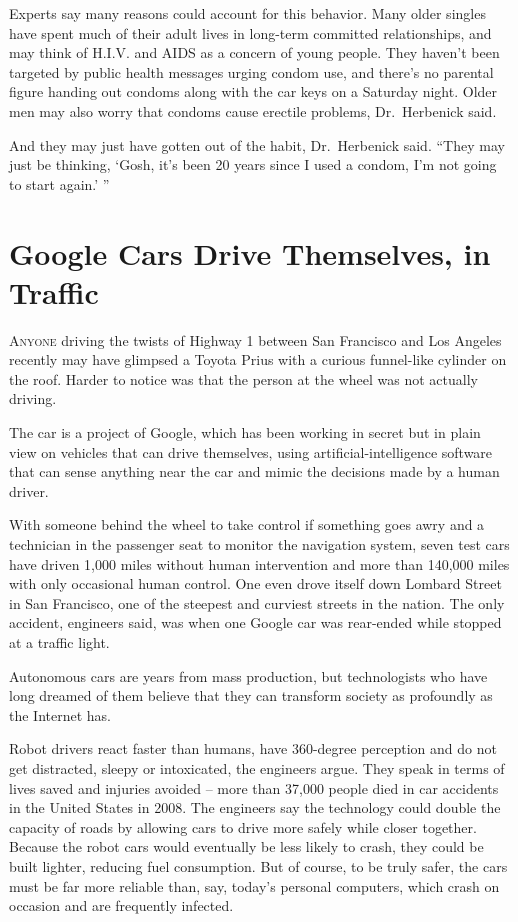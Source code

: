 ﻿\documentclass[12pt]{article}
\begin{document}
Experts say many reasons could account for this behavior. Many older singles have spent much of
their adult lives in long-term committed relationships, and may think of H.I.V. and AIDS as a
concern of young people. They haven't been targeted by public health messages urging condom use, and
there's no parental figure handing out condoms along with the car keys on a Saturday night. Older
men may also worry that condoms cause erectile problems, Dr.~Herbenick said.

And they may just have gotten out of the habit, Dr.~Herbenick said. ``They may just be thinking,
`Gosh, it's been 20 years since I used a condom, I'm not going to start again.' ''

\section{Google Cars Drive Themselves, in Traffic}

\lettrine{A}{nyone} driving the twists of Highway 1 between San Francisco
and Los Angeles recently may have glimpsed a Toyota Prius with a curious funnel-like cylinder on the
roof. Harder to notice was that the person at the wheel was not actually driving.

The car is a project of Google, which has been working in secret but in plain view on vehicles that
can drive themselves, using artificial-intelligence software that can sense anything near the car
and mimic the decisions made by a human driver.

With someone behind the wheel to take control if something goes awry and a technician in the
passenger seat to monitor the navigation system, seven test cars have driven 1,000 miles without
human intervention and more than 140,000 miles with only occasional human control. One even drove
itself down Lombard Street in San Francisco, one of the steepest and curviest streets in the nation.
The only accident, engineers said, was when one Google car was rear-ended while stopped at a traffic
light.

Autonomous cars are years from mass production, but technologists who have long dreamed of them
believe that they can transform society as profoundly as the Internet has.

Robot drivers react faster than humans, have 360-degree perception and do not get distracted, sleepy
or intoxicated, the engineers argue. They speak in terms of lives saved and injuries avoided -- more
than 37,000 people died in car accidents in the United States in 2008. The engineers say the
technology could double the capacity of roads by allowing cars to drive more safely while closer
together. Because the robot cars would eventually be less likely to crash, they could be built
lighter, reducing fuel consumption. But of course, to be truly safer, the cars must be far more
reliable than, say, today's personal computers, which crash on occasion and are frequently infected.
\end{document}
